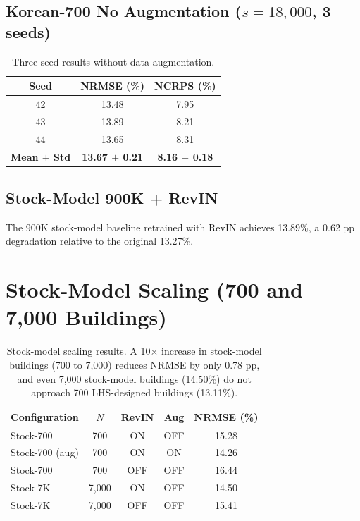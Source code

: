 \documentclass[preprint,12pt,authoryear]{elsarticle}
\begin{document}
\subsection{Korean-700 No Augmentation ($s = 18{,}000$, 3 seeds)}

\begin{table}[H]
\centering
\begin{tabular}{ccc}
\toprule
Seed & NRMSE (\%) & NCRPS (\%) \\
\midrule
42 & 13.48 & 7.95 \\
43 & 13.89 & 8.21 \\
44 & 13.65 & 8.31 \\
\textbf{Mean $\pm$ Std} & \textbf{13.67 $\pm$ 0.21} & \textbf{8.16 $\pm$ 0.18} \\
\bottomrule
\end{tabular}
\caption{Three-seed results without data augmentation.}
\label{tab:seeds_noaug}
\end{table}

\subsection{Stock-Model 900K + RevIN}

The 900K stock-model baseline retrained with RevIN achieves 13.89\%, a 0.62 pp degradation relative to the original 13.27\%.

\FloatBarrier
\section{Stock-Model Scaling (700 and 7,000 Buildings)}
\label{app:scaling}

\begin{table}[H]
\centering
\begin{tabular}{lcccc}
\toprule
Configuration & $N$ & RevIN & Aug & NRMSE (\%) \\
\midrule
Stock-700 & 700 & ON & OFF & 15.28 \\
Stock-700 (aug) & 700 & ON & ON & 14.26 \\
Stock-700 & 700 & OFF & OFF & 16.44 \\
Stock-7K & 7,000 & ON & OFF & 14.50 \\
Stock-7K & 7,000 & OFF & OFF & 15.41 \\
\bottomrule
\end{tabular}
\caption{Stock-model scaling results. A 10$\times$ increase in stock-model buildings (700 to 7,000) reduces NRMSE by only 0.78 pp, and even 7,000 stock-model buildings (14.50\%) do not approach 700 LHS-designed buildings (13.11\%).}
\label{tab:stock_scaling}
\end{table}
\end{document}
